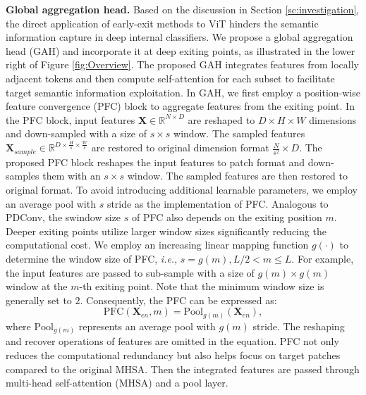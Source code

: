 \textbf{Global aggregation head.} 
Based on the discussion in Section \ref{sc:investigation}, the direct application of early-exit methods to ViT hinders the semantic information capture in deep internal classifiers. 
We propose a global aggregation head (GAH) and incorporate it at deep exiting points, as illustrated in the lower right of Figure \ref{fig:Overview}. 
The proposed GAH integrates features from locally adjacent tokens and then compute self-attention for each subset to facilitate target semantic information exploitation. 
In GAH,  
we first employ a position-wise feature convergence (PFC) block to aggregate features from the exiting point. 
In the PFC block, input features $\mathbf{X}\in \mathbb{R}^{N\times D}$ are reshaped to $D\times H\times W $ dimensions and down-sampled with a size of $s\times s$ window.
The sampled features $\mathbf{X}_{sample}\in \mathbb{R}^{D\times \frac{H}{s} \times \frac{W}{s}}$ are restored to original dimension format $\frac{N}{s^2}\times D$. 
The proposed PFC block reshapes the input features to patch format and down-samples them with an $s\times s$ window. 
The sampled features are then restored to original format. 
To avoid introducing additional learnable parameters, we employ an average pool with $s$ stride as the implementation of PFC. 
Analogous to PDConv, the swindow size $s$ of PFC also depends on the exiting position $m$. 
Deeper exiting points utilize larger window sizes significantly reducing the computational cost. 
We employ an increasing linear mapping function $g(\cdot)$ to determine the window size of PFC, \textit{i.e.}, $s=g(m), L/2 < m \leq L$. 
For example, the input features are passed to sub-sample with a size of $g(m)\times g(m)$ window at the $m$-th exiting point. 
Note that the minimum window size is generally set to $2$. 
Consequently, the PFC can be expressed as:
\begin{equation}
  \text{PFC}(\mathbf{X}_{en}, m)=\text{Pool}_{g(m)}(\mathbf{X}_{en}), 
\end{equation}
where $\text{Pool}_{g(m)}$ represents an average pool with $g(m)$ stride. The reshaping and recover operations of features are omitted in the equation. 
PFC not only reduces the computational redundancy but also helps focus on target patches compared to the original MHSA. 
Then the integrated features are passed through multi-head self-attention (MHSA) and a pool layer. 
